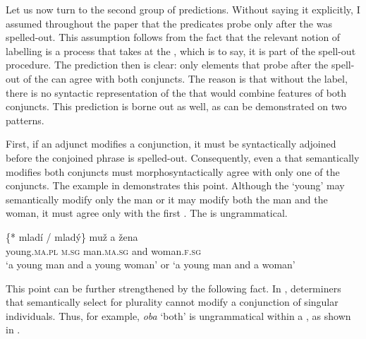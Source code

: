 \documentclass[output=paper,modfontsnewtxmath,hidelinks]{langscibook}
\begin{document}
\z

\noindent Let us now turn to the second group of predictions. Without saying it explicitly, I assumed throughout the paper that the predicates probe only after the  was spelled-out. This assumption follows from the fact that the relevant notion of labelling is a process that takes at the , which is to say, it is part of the spell-out procedure. The prediction then is clear: only elements that probe after the spell-out of the  can agree with both conjuncts. The reason is that without the label, there is no syntactic representation of the  that would combine features of both conjuncts. This prediction is borne out as well, as can be demonstrated on two  patterns.

First, if an  adjunct modifies a conjunction, it must be syntactically adjoined before the conjoined phrase is spelled-out. Consequently, even a  that semantically modifies both conjuncts must morphosyntactically agree with only one of the conjuncts. The example in  demonstrates this point. Although the  `young' may semantically modify only the man or it may modify both the man and the woman, it must agree only with the first . The  is ungrammatical.


\ea\gll \{*\hspace{-2pt} mladí / mladý\} muž a žena\label{adjunct}\\
{} young.\textsc{ma.pl} {} \textsc{m.sg} man.\textsc{ma.sg} and woman.\textsc{f.sg}\\
\glt `a young man and a young woman' or `a young man and a woman'
\z

\noindent This point can be further strengthened by the following fact. In , determiners that semantically select for plurality cannot modify a conjunction of singular individuals. Thus, for example, \textit{oba} `both' is ungrammatical within a , as shown in .

\z
\end{document}
